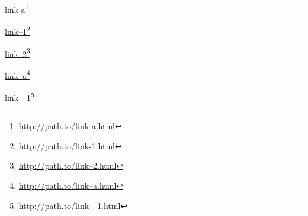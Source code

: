 \href{http://path.to/link-a.html}{link-a}\footnote{\href{http://path.to/link-a.html}{http:\slash \slash path.to\slash link-a.html}}

\href{http://path.to/link-1.html}{link--1}\footnote{\href{http://path.to/link-1.html}{http:\slash \slash path.to\slash link-1.html}}

\href{http://path.to/link--2.html}{link--2}\footnote{\href{http://path.to/link--2.html}{http:\slash \slash path.to\slash link--2.html}}

\href{http://path.to/link--a.html}{link--a}\footnote{\href{http://path.to/link--a.html}{http:\slash \slash path.to\slash link--a.html}}

\href{http://path.to/link---1.html}{link---1}\footnote{\href{http://path.to/link---1.html}{http:\slash \slash path.to\slash link---1.html}}




